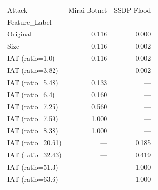 \begin{tabular}{lrr}
\toprule
Attack & Mirai Botnet & SSDP Flood \\
Feature_Label &  &  \\
\midrule
Original & 0.116 & 0.000 \\
Size & 0.116 & 0.002 \\
IAT (ratio=1.0) & 0.116 & 0.002 \\
IAT (ratio=3.82) & — & 0.002 \\
IAT (ratio=5.48) & 0.133 & — \\
IAT (ratio=6.4) & 0.160 & — \\
IAT (ratio=7.25) & 0.560 & — \\
IAT (ratio=7.59) & 1.000 & — \\
IAT (ratio=8.38) & 1.000 & — \\
IAT (ratio=20.61) & — & 0.185 \\
IAT (ratio=32.43) & — & 0.419 \\
IAT (ratio=51.3) & — & 1.000 \\
IAT (ratio=63.6) & — & 1.000 \\
\bottomrule
\end{tabular}

